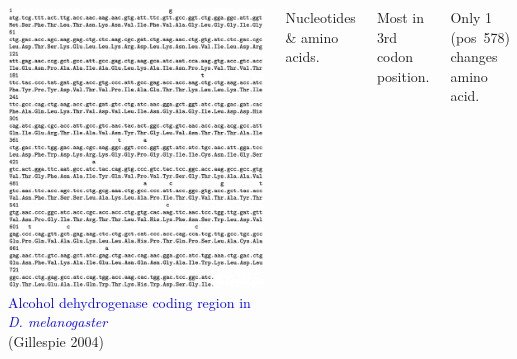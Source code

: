 \documentclass[12pt]{beamer}
\begin{document}
\begin{frame}
\begin{columns}
\includegraphics[width=\textwidth]{adhseq.png}
\textcolor{blue}{Alcohol dehydrogenase coding region in \emph{D. melanogaster}}\\
{\centering
\scriptsize(Gillespie 2004)\\}

Nucleotides \& amino acids.\\

\medskip

Most in 3rd codon position.

\medskip

Only 1 (pos~578) changes amino acid.
\end{columns}
\end{frame}
\end{document}

